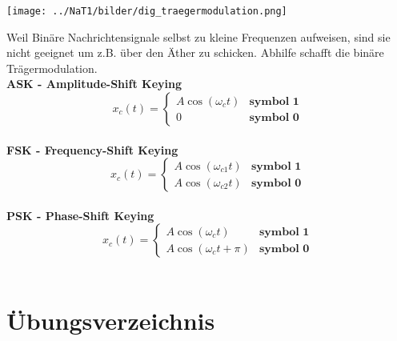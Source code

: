% 

\begin{minipage}{9cm}
	\texttt{[image: ../NaT1/bilder/dig\_traegermodulation.png]}
\end{minipage}
\begin{minipage}{9cm}
	Weil Binäre Nachrichtensignale selbst zu kleine Frequenzen aufweisen, sind sie nicht geeignet um
	z.B. über den Äther zu schicken. Abhilfe schafft die binäre Trägermodulation. 
	\vspace{1cm}  \\
	\textbf{ASK - Amplitude-Shift Keying} \\
	$$x_c(t) = \begin{cases}
           A \cos(\omega_c t) & \textbf{symbol 1} \\
           0 & \textbf{symbol 0}
           \end{cases} $$ \\
	\textbf{FSK - Frequency-Shift Keying} \\
	$$x_c(t) = \begin{cases}
           A \cos(\omega_{c1} t) & \textbf{symbol 1}     \\         
           A \cos(\omega_{c2} t) & \textbf{symbol 0}
           \end{cases} $$ \\
	\textbf{PSK - Phase-Shift Keying} \\
	$$x_c(t) = \begin{cases}
           A \cos(\omega_{c} t) & \textbf{symbol 1}        \\      
           A \cos(\omega_{c} t + \pi) & \textbf{symbol 0}
           \end{cases} $$ \\
\end{minipage}



\newpage
\section{Übungsverzeichnis}

